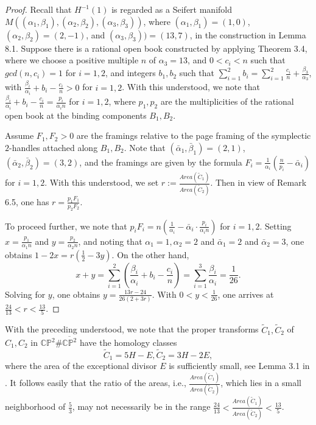\documentclass[11pt]{amsart}
\theoremstyle{plain}
\numberwithin{theorem}{section}
\theoremstyle{definition}
\newcommand{\C}{{\mathbb C}}
\renewcommand{\P}{{\mathbb P}}
\begin{document}
\begin{proof}
Recall that $H^{-1}(1)$ is regarded as a Seifert manifold 
$M((\alpha_1,\beta_1), (\alpha_2,\beta_2), (\alpha_3,\beta_3))$, where $(\alpha_1,\beta_1)=(1,0)$, 
$(\alpha_2,\beta_2)=(2,-1)$, and $(\alpha_3,\beta_3))=(13,7)$, in the construction in Lemma 8.1. 
Suppose there is a rational open book constructed by applying Theorem 3.4, where we choose 
a positive multiple $n$ of $\alpha_3=13$, and $0<c_i<n$ such that
$gcd(n,c_i)=1$ for $i=1,2$, and integers $b_1,b_2$ such that $\sum_{i=1}^2 b_i=\sum_{i=1}^2 \frac{c_i}{n}+\frac{\beta_3}{\alpha_3}$, with $\frac{\beta_i}{\alpha_i}+b_i-\frac{c_i}{n}>0$ for $i=1,2$. With this understood, we note that $\frac{\beta_i}{\alpha_i}+b_i-\frac{c_i}{n}=\frac{p_i}{\alpha_i n}$ for $i=1,2$, where $p_1,p_2$ are
the multiplicities of the rational open book at the binding components $B_1,B_2$.

Assume $F_1,F_2>0$ are the framings relative to the page framing of the symplectic $2$-handles attached along
$B_1,B_2$. Note that $(\bar{\alpha}_1,\bar{\beta}_1)=(2,1)$,  $(\bar{\alpha}_2,\bar{\beta}_2)=(3,2)$, and the framings are given by the formula $F_i=\frac{1}{\alpha_i}(\frac{n}{p_i}-\bar{\alpha}_i)$ for $i=1,2$. With this understood, we set $r:=\frac{Area(\tilde{C}_1)}{Area(\tilde{C}_2)}$. Then in view of Remark 6.5, one has $r=\frac{p_1F_1}{p_2F_2}$. 

To proceed further, we note that $p_iF_i=n(\frac{1}{\alpha_i}-\bar{\alpha}_i\cdot \frac{p_i}{\alpha_i n})$ for $i=1,2$.
Setting $x=\frac{p_1}{\alpha_1 n}$ and $y=\frac{p_2}{\alpha_2 n}$, and noting that $\alpha_1=1,\alpha_2=2$ and
$\bar{\alpha}_1=2$ and $\bar{\alpha}_2=3$, one obtains $1-2x=r(\frac{1}{2}-3y)$. On the other hand, 
$$
x+y=\sum_{i=1}^2 (\frac{\beta_i}{\alpha_i}+b_i-\frac{c_i}{n})=\sum_{i=1}^3 \frac{\beta_i}{\alpha_i}=\frac{1}{26}.
$$
Solving for $y$, one obtains $y=\frac{13r-24}{26(2+3r)}$. With $0<y<\frac{1}{26}$, one arrives at $\frac{24}{13}<r<\frac{13}{5}$. 

\end{proof}

With the preceding understood, we note that the proper transforms $\tilde{C}_1,\tilde{C}_2$ of $C_1,C_2$ in 
$\C\P^2\#\overline{\C\P^2}$ have the homology classes 
$$
\tilde{C}_1=5H-E, \tilde{C}_2=3H-2E, 
$$																						
where the area of the exceptional divisor $E$ is sufficiently small, see Lemma 3.1 in \cite{C5}. It follows easily that the ratio of the areas, i.e.,  $\frac{Area(\tilde{C}_1)}{Area(\tilde{C}_2)}$, which lies in a small neighborhood of $\frac{5}{3}$, may not necessarily be in the range $\frac{24}{13}<\frac{Area(\tilde{C}_1)}{Area(\tilde{C}_2)}<\frac{13}{5}$.
\end{document}
